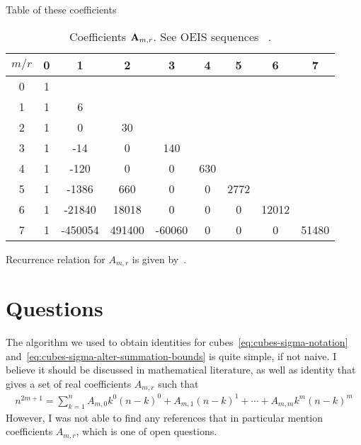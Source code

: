 Table of these coefficients

\begin{table}[H]
    \begin{center}
        \setlength\extrarowheight{-6pt}
        \begin{tabular}{c|cccccccc}
            $m/r$ & 0 & 1       & 2      & 3      & 4   & 5    & 6     & 7 \\ [3px]
            \hline
            0     & 1 &         &        &        &     &      &       &       \\
            1     & 1 & 6       &        &        &     &      &       &       \\
            2     & 1 & 0       & 30     &        &     &      &       &       \\
            3     & 1 & -14     & 0      & 140    &     &      &       &       \\
            4     & 1 & -120    & 0      & 0      & 630 &      &       &       \\
            5     & 1 & -1386   & 660    & 0      & 0   & 2772 &       &       \\
            6     & 1 & -21840  & 18018  & 0      & 0   & 0    & 12012 &       \\
            7     & 1 & -450054 & 491400 & -60060 & 0   & 0    & 0     & 51480
        \end{tabular}
    \end{center}
    \caption{Coefficients ${\mathbf{A}} \sb{m,r}$. See OEIS sequences
    ~\cite{oeis_numerators_of_the_coefficient_a_m_r,oeis_denominators_of_the_coefficient_a_m_r}.}
    \label{tab:table_of_coefficients_a}
\end{table}

Recurrence relation for $A_{m,r}$ is given by~\cite{alekseyev2018mathoverflow}.

\section{Questions}\label{sec:questions}

\begin{question}
    The algorithm we used to obtain identities for
    cubes~\eqref{eq:cubes-sigma-notation} and~\eqref{eq:cubes-sigma-alter-summation-bounds}
    is quite simple, if not naive.
    I believe it should be discussed in mathematical literature, as well as identity
    that gives a set of real coefficients $A_{m,r}$ such that
    \begin{align*}
        n^{2m+1} = \sum_{k=1}^{n} A_{m,0} k^0 (n-k)^0 + A_{m,1} (n-k)^1
        + \cdots + A_{m,m} k^m (n-k)^m
    \end{align*}
    However, I was not able to find any references that in particular mention coefficients $A_{m,r}$,
    which is one of open questions.
\end{question}

